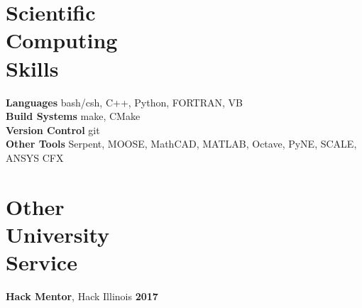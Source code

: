 \documentclass[margin,line]{resume}
\begin{document}
\begin{resume}
    \section{\mysidestyle Scientific\\Computing\\Skills}
                \textbf{Languages} \hfill bash/csh, C++, Python, FORTRAN, VB \vspace{.5mm}\\%
                \textbf{Build Systems} \hfill make, CMake\vspace{.5mm}\\%
                \textbf{Version Control} \hfill git\vspace{.5mm}\\%
                \textbf{Other Tools} \hfill Serpent, MOOSE, MathCAD, MATLAB, Octave, PyNE, SCALE, ANSYS CFX\vspace{.5mm}%

    \section{\mysidestyle Other\\University\\Service}
		\textbf{Hack Mentor}, Hack Illinois \hfill \textbf{2017}\vspace{.5mm}\\%


\end{resume}
\end{document}
